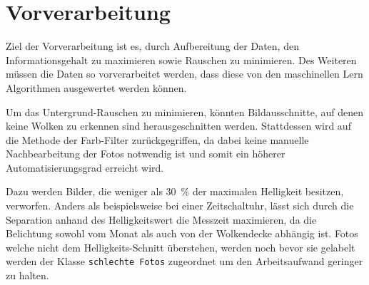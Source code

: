 \section{Vorverarbeitung}
\label{sec:03_Preprocessing}
Ziel der Vorverarbeitung ist es, durch Aufbereitung der Daten, den
Informationsgehalt zu maximieren sowie Rauschen zu minimieren.
Des Weiteren müssen die Daten so vorverarbeitet werden, dass diese 
von den maschinellen Lern Algorithmen ausgewertet werden können. 

Um das Untergrund-Rauschen zu minimieren, könnten Bildausschnitte, auf 
denen keine Wolken zu erkennen sind herausgeschnitten werden.
Stattdessen wird auf die Methode der Farb-Filter zurückgegriffen, da dabei 
keine manuelle Nachbearbeitung der Fotos notwendig ist und somit ein höherer 
Automatisierungsgrad erreicht wird.

Dazu werden Bilder, die weniger als \SI{30}{\percent} der maximalen Helligkeit 
besitzen, verworfen. 
Anders als beispielsweise bei einer Zeitschaltuhr, lässt sich durch die
Separation anhand des Helligkeitswert die Messzeit maximieren, da die 
Belichtung sowohl vom Monat als auch von der Wolkendecke abhängig ist.
Fotos welche nicht dem Helligkeits-Schnitt überstehen, werden noch bevor 
sie gelabelt werden der Klasse \texttt{schlechte Fotos} zugeordnet um 
den Arbeitsaufwand geringer zu halten.

